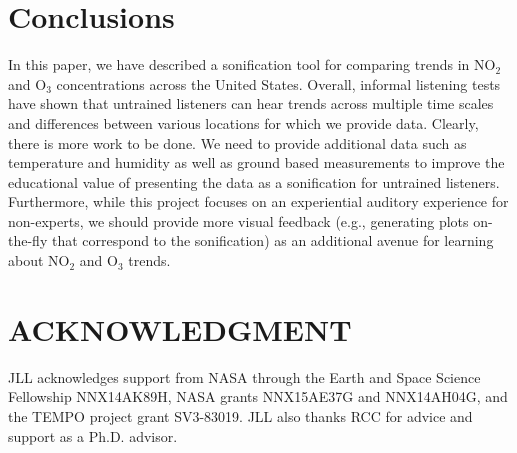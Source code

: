 \documentclass[a4paper,10pt,oneside]{article}
\newcommand{\ce}[1]{$\mathrm{#1}$}
\begin{document}
\begin{sloppy}
\section{Conclusions}
In this paper, we have described a sonification tool for comparing trends in \ce{NO_2} and \ce{O_3} concentrations across the United States.  Overall, informal listening tests have shown that untrained listeners can  hear trends across multiple time scales and differences between various locations for which we provide data.  Clearly, there is more work to be done. We need to provide additional data such as temperature and humidity as well as ground based measurements to improve the educational value of presenting the data as a sonification for untrained listeners.  Furthermore, while this project focuses on an experiential auditory experience for non-experts, we should provide more visual feedback (e.g., generating plots on-the-fly that correspond to the sonification) as an additional avenue for learning about \ce{NO_2} and \ce{O_3} trends.  


\section{ACKNOWLEDGMENT}
\label{sec:ack}

JLL acknowledges support from NASA through the Earth and Space Science Fellowship NNX14AK89H, NASA grants NNX15AE37G and NNX14AH04G, and the TEMPO project grant SV3-83019.  JLL also thanks RCC for advice and support as a Ph.D. advisor.





\AtEndDocument{\par\leavevmode}
\end{sloppy}
\end{document}
